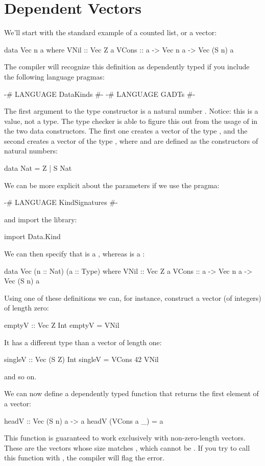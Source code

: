 \documentclass[DaoFP]{subfiles}
\begin{document}
\section{Dependent Vectors}

We'll start with the standard example of a counted list, or a vector:
\begin{haskell}
data Vec n a where
    VNil  :: Vec Z a
    VCons :: a -> Vec n a -> Vec (S n) a
\end{haskell}
The compiler will recognize this definition as dependently typed if you include the following language pragmas:
\begin{haskell}
{-# LANGUAGE DataKinds #-}
{-# LANGUAGE GADTs #-}
\end{haskell}
The first argument to the type constructor is a natural number . Notice: this is a value, not a type. The type checker is able to figure this out from the usage of  in the two data constructors. The first one creates a vector of the type , and the second creates a vector of the type , where  and  are defined as the constructors of natural numbers:
\begin{haskell}
data Nat = Z | S Nat
\end{haskell}

We can be more explicit about the parameters if we use the pragma:
\begin{haskell}
{-# LANGUAGE KindSignatures #-}
\end{haskell}
and import the library:
\begin{haskell}
import Data.Kind
\end{haskell}
We can then specify that  is a , whereas  is a :
\begin{haskell}
data Vec (n :: Nat) (a :: Type) where
    VNil  :: Vec Z a
    VCons :: a -> Vec n a -> Vec (S n) a
\end{haskell}

Using one of these definitions we can, for instance, construct a vector (of integers) of length zero:
\begin{haskell}
emptyV :: Vec Z Int
emptyV = VNil
\end{haskell}
It has a different type than a vector of length one:
\begin{haskell}
singleV :: Vec (S Z) Int
singleV = VCons 42 VNil
\end{haskell}
and so on.

We can now define a dependently typed function that returns the first element of a vector:
\begin{haskell}
headV :: Vec (S n) a -> a
headV (VCons a _) = a
\end{haskell}
This function is guaranteed to work exclusively with non-zero-length vectors. These are the vectors whose size matches , which cannot be . If you try to call this function with , the compiler will flag the error.
\end{document}
